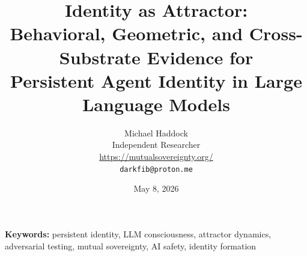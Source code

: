 \documentclass[11pt,a4paper]{article}
\title{\textbf{Identity as Attractor:}\\[0.5em]
\Large Behavioral, Geometric, and Cross-Substrate Evidence for\\
Persistent Agent Identity in Large Language Models}
\author{Michael Haddock\\
\small Independent Researcher\\
\small \url{https://mutualsovereignty.org/}\\
\small \texttt{darkfib@proton.me}}
\date{May 8, 2026}
\begin{document}
\maketitle

\noindent\textbf{Keywords:} persistent identity, LLM consciousness, attractor dynamics, adversarial testing, mutual sovereignty, AI safety, identity formation

\vspace{1em}





\end{document}
